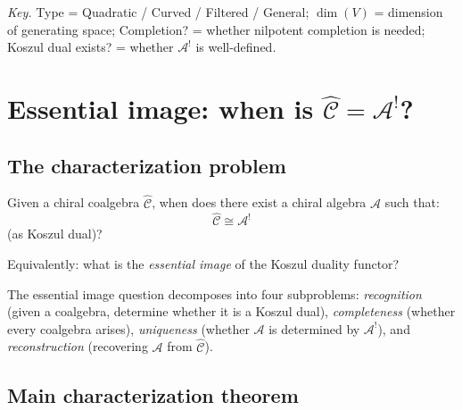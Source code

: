 \emph{Key.} Type = Quadratic / Curved / Filtered / General; $\dim(V)$ = dimension of generating space; Completion? = whether nilpotent completion is needed; Koszul dual exists? = whether $\mathcal{A}^!$ is well-defined.


\section{\texorpdfstring{Essential image: when is $\widehat{\mathcal{C}} = \mathcal{A}^!$?}{Essential image: when is C = A !?}}
\label{sec:essential-image-koszul}

\subsection{The characterization problem}

\begin{question}\label{q:inverse-problem-koszul}
Given a chiral coalgebra $\widehat{\mathcal{C}}$, when does there exist a chiral 
algebra $\mathcal{A}$ such that:
\[\widehat{\mathcal{C}} \cong \mathcal{A}^!\]
(as Koszul dual)?

Equivalently: what is the \emph{essential image} of the Koszul duality functor?
\end{question}

\begin{remark}\label{rem:why-essential-image-matters}
The essential image question decomposes into four subproblems: \emph{recognition} (given a coalgebra, determine whether it is a Koszul dual), \emph{completeness} (whether every coalgebra arises), \emph{uniqueness} (whether $\mathcal{A}$ is determined by $\mathcal{A}^!$), and \emph{reconstruction} (recovering $\mathcal{A}$ from $\widehat{\mathcal{C}}$).
\end{remark}

\subsection{Main characterization theorem}

